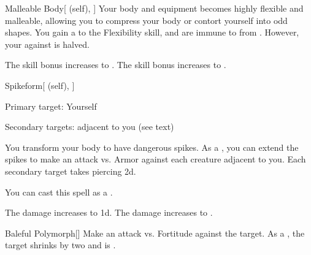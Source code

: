 \lowercase{\hypertarget{spell:Malleable Body}{}}\label{spell:Malleable Body}
\begin{attuneability}[Rank 4]{\hypertarget{spell:Malleable Body}{Malleable Body}}[ (self), ]
Your body and equipment becomes highly flexible and malleable, allowing you to compress your body or contort yourself into odd shapes.
You gain a   to the Flexibility skill, and are immune to  from .
However, your  against  is halved.

\rankline
{} The skill bonus increases to .
 The skill bonus increases to .
\end{attuneability}
\vspace{0.25em}



\lowercase{\hypertarget{spell:Spikeform}{}}\label{spell:Spikeform}
\begin{attuneability}[Rank 4]{\hypertarget{spell:Spikeform}{Spikeform}}[ (self), ]

Primary target: Yourself
\par\noindent
Secondary targets:  adjacent to you (see text)

You transform your body to have dangerous spikes.
As a , you can extend the spikes to make an attack vs. Armor against each creature adjacent to you.
\hit Each secondary target takes piercing  \minus2d.

You can cast this spell as a .

\rankline
{} The damage increases to  \minus1d.
 The damage increases to .
\end{attuneability}
\vspace{0.25em}



\lowercase{\hypertarget{spell:Baleful Polymorph}{}}\label{spell:Baleful Polymorph}
\begin{freeability}[Rank 7]{\hypertarget{spell:Baleful Polymorph}{Baleful Polymorph}}[]
Make an attack vs. Fortitude against the target.
\hit As a , the target shrinks by two  and is .
\end{freeability}
\vspace{0.25em}



